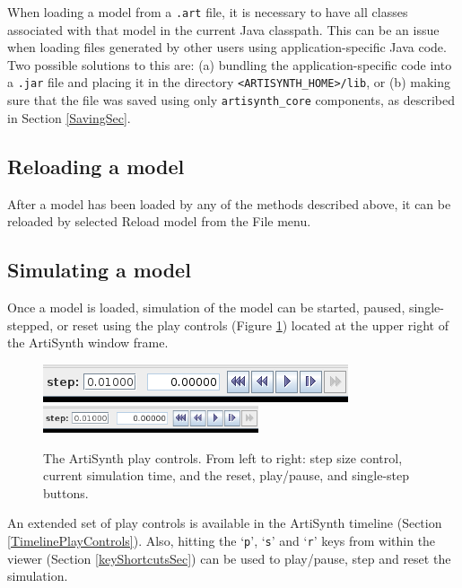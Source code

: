 \documentclass{article}
\begin{document}
\begin{sideblock}
When loading a model from a {\tt .art} file, it is necessary to have
all classes associated with that model in the current Java classpath.
This can be an issue when loading files generated by other users using
application-specific Java code. Two possible solutions to this are:
(a) bundling the application-specific code into a {\tt .jar} file and
placing it in the directory {\tt <ARTISYNTH\_HOME>/lib}, or (b) making
sure that the file was saved using only {\tt artisynth\_core}
components, as described in Section \ref{SavingSec}.
\end{sideblock}

\subsection{Reloading a model}

After a model has been loaded by any of the methods described above,
it can be reloaded by selected {\sf Reload model} from the {\sf File}
menu.

\subsection{Simulating a model}
\label{SimulatingSec}

Once a model is loaded, simulation of the model can be started,
paused, single-stepped, or reset using the play controls (Figure
\ref{PlayControlsFig}) located at the upper right of the ArtiSynth
window frame.

\begin{figure}
\begin{center}
\iflatexml
\includegraphics[]{images/playControls}
\else
\includegraphics[width=2.5in]{images/playControls}
\fi
\end{center}
\caption{The ArtiSynth play controls. From left to right: step size
control, current simulation time, and the reset, play/pause, and
single-step buttons.}%
\label{PlayControlsFig}
\end{figure}

An extended set of play controls is available in the ArtiSynth
timeline (Section \ref{TimelinePlayControls}).  Also, hitting the
`{\tt p}', `{\tt s}' and `{\tt r}' keys from within the viewer (Section
\ref{keyShortcutsSec}) can be used to play/pause, step and reset the
simulation.
\end{document}
